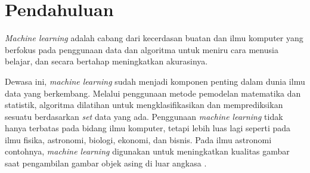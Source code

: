 \section{Pendahuluan}
\label{sec:intro}
\emph{Machine learning} adalah cabang dari kecerdasan buatan dan ilmu komputer yang berfokus
pada penggunaan data dan algoritma untuk meniru cara menusia belajar, dan secara bertahap meningkatkan akurasinya.

Dewasa ini, \emph{machine learning} sudah menjadi komponen penting dalam dunia ilmu data yang berkembang.
Melalui penggunaan metode pemodelan matematika dan statistik, algoritma dilatihan untuk mengklasifikasikan dan memprediksikan sesuatu
berdasarkan \emph{set} data yang ada. Penggunaan \emph{machine learning} tidak hanya terbatas pada bidang ilmu komputer, tetapi lebih luas lagi seperti pada
ilmu fisika, astronomi, biologi, ekonomi, dan bisnis. Pada ilmu astronomi contohnya, \emph{machine learning} digunakan untuk meningkatkan kualitas gambar saat pengambilan gambar objek asing di luar angkasa \cite{gilda2020astronomical}.